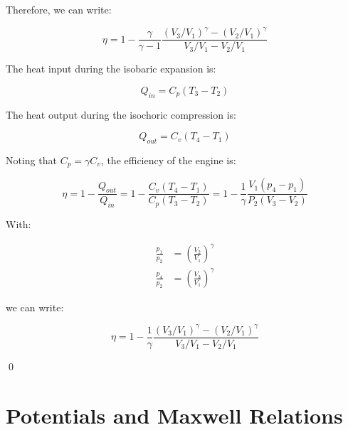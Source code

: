 \documentclass[12pt]{article}
\begin{document}
Therefore, we can write:

\begin{equation}
    \eta = 1 - \frac{\gamma}{\gamma - 1} \frac{(V_{3}/V_{1})^{\gamma} - (V_{2}/V_{1})^{\gamma}}{V_{3}/V_{1} - V_{2}/V_{1}}
\end{equation}

\begin{correction}
    The heat input during the isobaric expansion is:

    \begin{equation}
        Q_{in} = C_{p} (T_{3} - T_{2})
    \end{equation}

    The heat output during the isochoric compression is:

    \begin{equation}
        Q_{out} = C_{v} (T_{4} - T_{1})
    \end{equation}

    Noting that $C_{p} = \gamma C_{v}$, the efficiency of the engine is:

    \begin{equation}
        \eta = 1 - \frac{Q_{out}}{Q_{in}} = 1 - \frac{C_{v} (T_{4} - T_{1})}{C_{p} (T_{3} - T_{2})} = 1 - \frac{1}{\gamma} \frac{V_{1} (p_{4} - p_{1})}{P_{2} (V_{3} - V_{2})}
    \end{equation}

    With:

    \begin{equation}
        \begin{split}
            \frac{p_{1}}{p_{2}} &= \left( \frac{V_{2}}{V_{1}} \right)^{\gamma} \\
            \frac{p_{4}}{p_{2}} &= \left( \frac{V_{3}}{V_{1}} \right)^{\gamma}
        \end{split}
    \end{equation}

    we can write:

    \begin{equation}
        \eta = 1 - \frac{1}{\gamma} \frac{(V_{3}/V_{1})^{\gamma} - (V_{2}/V_{1})^{\gamma}}{V_{3}/V_{1} - V_{2}/V_{1}}
    \end{equation}
\end{correction}
\qed


\pagebreak
\section*{Potentials and Maxwell Relations}
\end{document}
